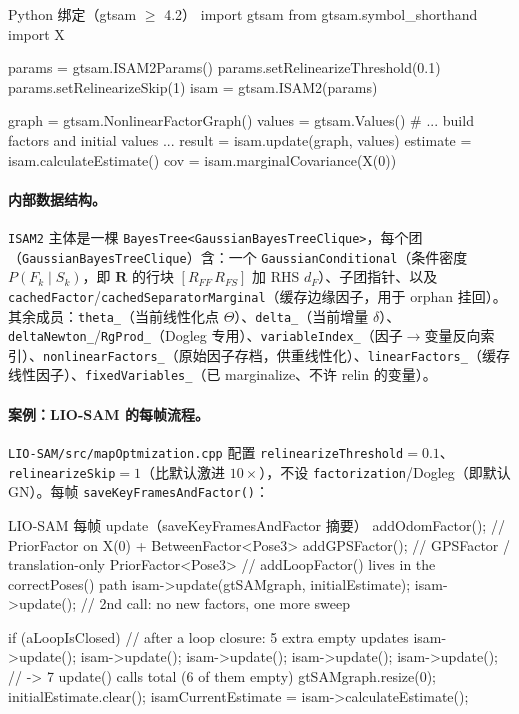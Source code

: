 \begin{codebox}[Python]{Python 绑定（gtsam $\ge$ 4.2）}
import gtsam
from gtsam.symbol_shorthand import X

params = gtsam.ISAM2Params()
params.setRelinearizeThreshold(0.1)
params.setRelinearizeSkip(1)
isam = gtsam.ISAM2(params)

graph  = gtsam.NonlinearFactorGraph()
values = gtsam.Values()
# ... build factors and initial values ...
result   = isam.update(graph, values)
estimate = isam.calculateEstimate()
cov      = isam.marginalCovariance(X(0))
\end{codebox}

\paragraph{内部数据结构。}
\texttt{ISAM2} 主体是一棵 \texttt{BayesTree<GaussianBayesTreeClique>}，每个团（\texttt{GaussianBayesTreeClique}）含：一个 \texttt{GaussianConditional}（条件密度 $P(F_k\mid S_k)$，即 $\mathbf{R}$ 的行块 $[R_{FF}\,R_{FS}]$ 加 RHS $d_F$）、子团指针、以及 \texttt{cachedFactor}/\allowbreak\texttt{cachedSeparatorMarginal}（缓存边缘因子，用于 orphan 挂回）。其余成员：\texttt{theta\_}（当前线性化点 $\Theta$）、\texttt{delta\_}（当前增量 $\delta$）、\texttt{deltaNewton\_}/\allowbreak\texttt{RgProd\_}（Dogleg 专用）、\texttt{variableIndex\_}（因子$\to$变量反向索引）、\texttt{nonlinearFactors\_}（原始因子存档，供重线性化）、\texttt{linearFactors\_}（缓存线性因子）、\texttt{fixedVariables\_}（已 marginalize、不许 relin 的变量）。

\paragraph{案例：LIO-SAM 的每帧流程。}
\texttt{LIO-SAM/\allowbreak src/\allowbreak mapOptmization.\allowbreak cpp} 配置 \texttt{relinearizeThreshold}$=0.1$、\texttt{relinearizeSkip}$=1$（比默认激进 $10\times$），不设 \texttt{factorization}/Dogleg（即默认 GN）。每帧 \texttt{saveKeyFramesAndFactor()}：

\begin{codebox}[C++]{LIO-SAM 每帧 update（saveKeyFramesAndFactor 摘要）}
addOdomFactor();        // PriorFactor on X(0) + BetweenFactor<Pose3>
addGPSFactor();         // GPSFactor / translation-only PriorFactor<Pose3>
// addLoopFactor() lives in the correctPoses() path
isam->update(gtSAMgraph, initialEstimate);
isam->update();         // 2nd call: no new factors, one more sweep

if (aLoopIsClosed) {    // after a loop closure: 5 extra empty updates
    isam->update(); isam->update(); isam->update();
    isam->update(); isam->update();   // -> 7 update() calls total (6 of them empty)
}
gtSAMgraph.resize(0);
initialEstimate.clear();
isamCurrentEstimate = isam->calculateEstimate();
\end{codebox}

